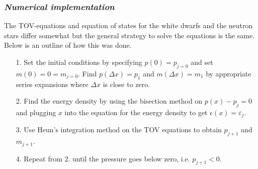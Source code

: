 \documentclass[twocolumn]{article}
\begin{document}
\begin{large}


\subsubsection*{\textit{Numerical implementation}}
The TOV-equations and equation of states for the white dwarfs and the neutron stars differ somewhat but the general strategy to solve the equations is the same. Below is an outline of how this was done.

\begin{itemize}
    \item[1.] Set the initial conditions by specifying $p(0) = p_{j=0}$ and set $m(0) = 0 = m_{j=0}$. Find $p(\Delta x)=p_1$ and $m(\Delta x)=m_1$ by appropriate series expansions where $\Delta x$ is close to zero.
    \item[2.] Find the energy density by using the bisection method on $p(x) - p_j = 0$ and plugging $x$ into the equation for the energy density to get $\epsilon(x)=\varepsilon_j$. 
    \item[3.] Use Heun's integration method on the TOV equations to obtain $p_{j+1}$ and $m_{j+1}$. 
    \item[4.] Repeat from 2. until the pressure goes below zero, i.e. $p_{j+1}<0$.
\end{itemize}


\end{large}
\end{document}
